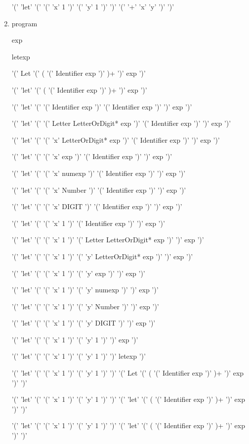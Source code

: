 \documentclass[11pt]{article}
\begin{document}
\begin{enumerate}
		'(' 'let' '(' '(' 'x' 1 ')' '(' 'y' 1 ')' ')' '(' '+' 'x' 'y' ')' ')'

	\item program

	exp

	letexp

	'(' Let '(' ( '(' Identifier exp ')' )+ ')' exp ')'

	'(' 'let' '(' ( '(' Identifier exp ')' )+ ')' exp ')'

	'(' 'let' '(' '(' Identifier exp ')' '(' Identifier exp ')' ')' exp ')'

	'(' 'let' '(' '(' Letter LetterOrDigit* exp ')' '(' Identifier exp ')' ')' exp ')'

	'(' 'let' '(' '(' 'x' LetterOrDigit* exp ')' '(' Identifier exp ')' ')' exp ')'

	'(' 'let' '(' '(' 'x' exp ')' '(' Identifier exp ')' ')' exp ')'

	'(' 'let' '(' '(' 'x' numexp ')' '(' Identifier exp ')' ')' exp ')'

	'(' 'let' '(' '(' 'x' Number ')' '(' Identifier exp ')' ')' exp ')'

	'(' 'let' '(' '(' 'x' DIGIT ')' '(' Identifier exp ')' ')' exp ')'

	'(' 'let' '(' '(' 'x' 1 ')' '(' Identifier exp ')' ')' exp ')'

	'(' 'let' '(' '(' 'x' 1 ')' '(' Letter LetterOrDigit* exp ')' ')' exp ')'

	'(' 'let' '(' '(' 'x' 1 ')' '(' 'y' LetterOrDigit* exp ')' ')' exp ')'

	'(' 'let' '(' '(' 'x' 1 ')' '(' 'y' exp ')' ')' exp ')'

	'(' 'let' '(' '(' 'x' 1 ')' '(' 'y' numexp ')' ')' exp ')'

	'(' 'let' '(' '(' 'x' 1 ')' '(' 'y' Number ')' ')' exp ')'

	'(' 'let' '(' '(' 'x' 1 ')' '(' 'y' DIGIT ')' ')' exp ')'

	'(' 'let' '(' '(' 'x' 1 ')' '(' 'y' 1 ')' ')' exp ')'

	'(' 'let' '(' '(' 'x' 1 ')' '(' 'y' 1 ')' ')' letexp ')'

	'(' 'let' '(' '(' 'x' 1 ')' '(' 'y' 1 ')' ')' '(' Let '(' ( '(' Identifier exp ')' )+ ')' exp ')' ')'

	'(' 'let' '(' '(' 'x' 1 ')' '(' 'y' 1 ')' ')' '(' 'let' '(' ( '(' Identifier exp ')' )+ ')' exp ')' ')'

	'(' 'let' '(' '(' 'x' 1 ')' '(' 'y' 1 ')' ')' '(' 'let' '(' ( '(' Identifier exp ')' )+ ')' exp ')' ')'


\end{enumerate}
\end{document}
